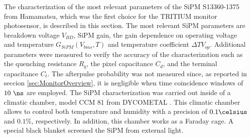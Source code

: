 The characterization of the most relevant parameters of the SiPM S13360-1375 from Hamamatsu, which was the first choice for the TRITIUM monitor photosensor, is described in this section. The most relevant SiPM parameters are breakdown voltage $V_{BD}$, SiPM gain, the gain dependence on operating voltage and temperature $G_{SiPM}(V_{bias}, T)$ and temperature coefficient $\Delta T V_{op}$. Additional parameters were measured to verify the accuracy of the characterization such as the quenching resistance $R_q$, the pixel capacitance $C_d$, and the terminal capacitance $C_t$. The afterpulse probability was not measured since, as reported in seccion \ref{sec:MonitorOverview}, it is negligible when time coincidence windows of $10~\ns$ are employed. The SiPM characterization was carried out inside of a climatic chamber, model CCM 81 from DYCOMETAL \cite{ClimaticChamberIFIMED}. This climatic chamber allows to control both temperature and humidity with a precision of $0.1\celsius$ and $0.1\%$, respectively. In addition, this chamber works as a Faraday cage. A special black blanket \cite{BlackBlancket} screened the SiPM from external light. 

